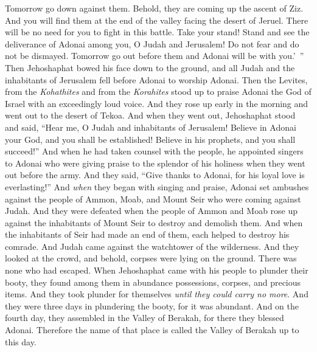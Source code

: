\begin{biblechapter}
\verse Tomorrow go down against them. Behold, they are coming up the ascent of Ziz. And you will find them at the end of the valley facing the desert of Jeruel.
\verse There will be no need for you to fight in this battle. Take your stand! Stand and see the deliverance of Adonai among you, O Judah and Jerusalem! Do not fear and do not be dismayed. Tomorrow go out before them and Adonai will be with you.’ ”
\verse Then Jehoshaphat bowed his face down to the ground, and all Judah and the inhabitants of Jerusalem fell before Adonai to worship Adonai.
\verse Then the Levites, from the \textit{Kohathites} and from the \textit{Korahites} stood up to praise Adonai the God of Israel with an exceedingly loud voice.
 And they rose up early in the morning and went out to the desert of Tekoa. And when they went out, Jehoshaphat stood and said, “Hear me, O Judah and inhabitants of Jerusalem! Believe in Adonai your God, and you shall be established! Believe in his prophets, and you shall succeed!”
\verse And when he had taken counsel with the people, he appointed singers to Adonai who were giving praise to the splendor of his holiness when they went out before the army. And they said, “Give thanks to Adonai, for his loyal love is everlasting!”
\verse And \textit{when} they began with singing and praise, Adonai set ambushes against the people of Ammon, Moab, and Mount Seir who were coming against Judah. And they were defeated
\verse when the people of Ammon and Moab rose up against the inhabitants of Mount Seir to destroy and demolish them. And when the inhabitants of Seir had made an end of them, each helped to destroy his comrade.
\verse And Judah came against the watchtower of the wilderness. And they looked at the crowd, and behold, corpses were lying on the ground. There was none who had escaped.
\verse When Jehoshaphat came with his people to plunder their booty, they found among them in abundance possessions, corpses, and precious items. And they took plunder for themselves \textit{until they could carry no more}. And they were three days in plundering the booty, for it was abundant.
\verse And on the fourth day, they assembled in the Valley of Berakah, for there they blessed Adonai. Therefore the name of that place is called the Valley of Berakah up to this day.

\end{biblechapter}
